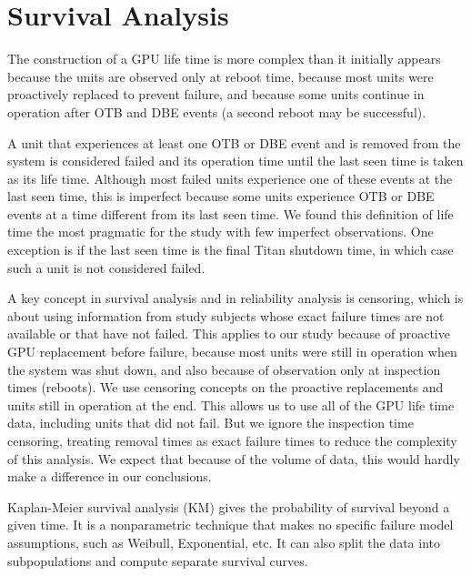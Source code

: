 \section{Survival Analysis}
\label{section:survival}
The construction of a GPU life time is more complex than it initially
appears because the units are observed only at reboot time, because
most units were proactively replaced to prevent failure, and because
some units continue in operation after OTB and DBE events (a second
reboot may be successful).

A unit that experiences at least one OTB or DBE event and is removed
from the system is considered failed and its operation time until the
last seen time is taken as its life time. Although most failed units
experience one of these events at the last seen time, this is
imperfect because some units experience OTB or DBE events at a time
different from its last seen time. We found this definition of life
time the most pragmatic for the study with few imperfect
observations. One exception is if the last seen time is the final
Titan shutdown time, in which case such a unit is not considered
failed.

A key concept in survival analysis and in reliability analysis is
censoring, which is about using information from study subjects whose
exact failure times are not available or that have not failed. This
applies to our study because of proactive GPU replacement before
failure, because most units were still in operation when the system
was shut down, and also because of observation only at inspection
times (reboots). We use censoring concepts on the proactive
replacements and units still in operation at the end. This allows us
to use all of the GPU life time data, including units that did not
fail. But we ignore the inspection time censoring, treating removal
times as exact failure times to reduce the complexity of this
analysis. We expect that because of the volume of data, this would
hardly make a difference in our conclusions.

Kaplan-Meier survival analysis (KM) gives the probability of survival
beyond a given time. It is a nonparametric technique that makes no
specific failure model assumptions, such as Weibull, Exponential,
etc. It can also split the data into subpopulations and compute
separate survival curves. 

